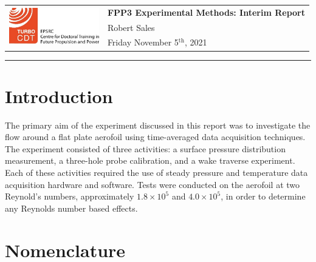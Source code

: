 \documentclass[11pt,a4paper,twocolumn]{article}
\begin{document}
{\setlength{\extrarowheight}{0.7mm} \setlength{\tabcolsep}{0mm}
\begin{tabularx}{\textwidth}{l Z}
 & \normalsize {\textbf{FPP3 Experimental Methods: Interim Report}} \\
& \normalsize{Robert Sales} \\
& \normalsize{Friday November 5$^{\text{th}}$, 2021} \\
\end{tabularx}}
\rule{\textwidth}{1pt}
\section{Introduction}
The primary aim of the experiment discussed in this report was to investigate the flow around a flat plate aerofoil using time-averaged data acquisition techniques. The experiment consisted of three activities: a surface pressure distribution measurement, a three-hole probe calibration, and a wake traverse experiment. Each of these activities required the use of steady pressure and temperature data acquisition hardware and software. Tests were conducted on the aerofoil at two Reynold’s numbers, approximately $1.8\times10^5$ and $4.0\times10^5$, in order to determine any Reynolds number based effects. 

\section{Nomenclature}
\end{document}
